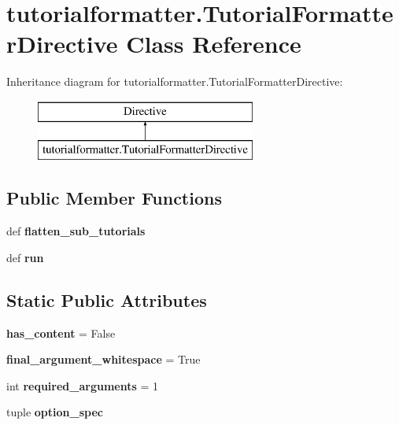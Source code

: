 \section{tutorialformatter.\-Tutorial\-Formatter\-Directive Class Reference}
\label{classtutorialformatter_1_1_tutorial_formatter_directive}
Inheritance diagram for tutorialformatter.\-Tutorial\-Formatter\-Directive\-:\begin{figure}[H]
\begin{center}
\leavevmode
\includegraphics[height=2.000000cm]{classtutorialformatter_1_1_tutorial_formatter_directive}
\end{center}
\end{figure}
\subsection*{Public Member Functions}
\begin{DoxyCompactItemize}
\item 
def {\bfseries flatten\-\_\-sub\-\_\-tutorials}\label{classtutorialformatter_1_1_tutorial_formatter_directive_acfbe455cba049bf6073d93d1d99343b5}

\item 
def {\bfseries run}\label{classtutorialformatter_1_1_tutorial_formatter_directive_aae41fdd749ed9e30ac1c0a36112db384}

\end{DoxyCompactItemize}
\subsection*{Static Public Attributes}
\begin{DoxyCompactItemize}
\item 
{\bfseries has\-\_\-content} = False\label{classtutorialformatter_1_1_tutorial_formatter_directive_af0c47bdd1efa8de261098e93f90555b1}

\item 
{\bfseries final\-\_\-argument\-\_\-whitespace} = True\label{classtutorialformatter_1_1_tutorial_formatter_directive_af84e86e38bf4983b5a628d183899942b}

\item 
int {\bfseries required\-\_\-arguments} = 1\label{classtutorialformatter_1_1_tutorial_formatter_directive_ac578c9b7e68dd4d8bfc3363c3cbff6db}

\item 
tuple {\bfseries option\-\_\-spec}
\end{DoxyCompactItemize}


